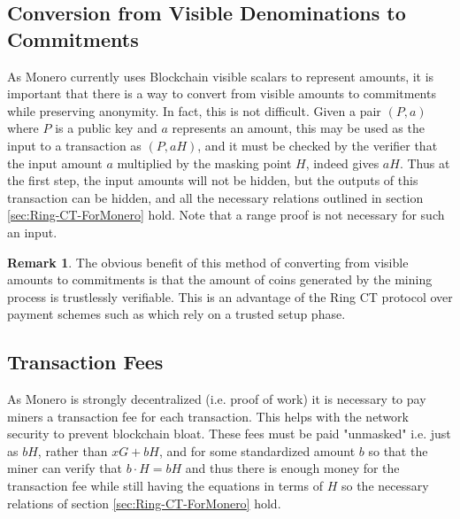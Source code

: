 \documentclass[12pt,english]{mrl}
\theoremstyle{definition}
\newtheorem{rem}[lem]{Remark}
\numberwithin{equation}{section}
\numberwithin{figure}{section}
\numberwithin{equation}{section}
\numberwithin{equation}{section}
\numberwithin{figure}{section}
\begin{document}
\subsection{Conversion from Visible Denominations to Commitments}
\label{conversion}

As Monero currently uses Blockchain visible scalars to represent amounts, it is important that there is a way to convert from visible amounts to commitments while preserving anonymity. In fact, this is not difficult. Given a pair $(P, a)$ where $P$ is a public key and $a$ represents an amount, this may be used as the input to a transaction as $(P, aH)$, and it must be checked by the verifier that the input amount $a$ multiplied by the masking point $H$, indeed gives $aH$. Thus at the first step, the input amounts will not be hidden, but the outputs of this transaction can be hidden, and all the necessary relations outlined in section \ref{sec:Ring-CT-ForMonero} hold. Note that a range proof is not necessary for such an input.
\begin{rem}
The obvious benefit of this method of converting from visible amounts to commitments is that the amount of coins generated by the mining process is trustlessly verifiable. This is an advantage of the Ring CT protocol over payment schemes such as \cite{Z} which rely on a trusted setup phase. 
\end{rem}
\subsection{Transaction Fees}
As Monero is strongly decentralized (i.e. proof of work) it is necessary to pay miners a transaction fee for each transaction. This helps with the network security to prevent blockchain bloat. These fees must be paid "unmasked" i.e. just as $bH$, rather than $xG+bH$, and for some standardized amount $b$ so that the miner can verify that $b\cdot H = bH$ and thus there is enough money for the transaction fee while still having the equations in terms of $H$ so the necessary relations of section \ref{sec:Ring-CT-ForMonero} hold. 
\end{document}
